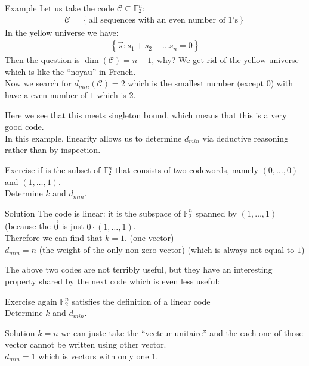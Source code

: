 \begin{parag}{Example}
    Let us take the code $\mathcal{C} \subseteq \mathbb{F}_2^n$:
    \begin{align*} \mathcal{C} =  \left\{\text{all sequences with an even number of 1's}\right\} \end{align*}
    In the yellow universe we have:
    \begin{align*} \left\{\vec{s}: s_1 + s_2 + \ldots s_n = 0\right\} \end{align*}
    Then the question is $\dim \left(\mathcal{C}\right) = n-1$, why? We get rid of the yellow universe which is like the ``noyau'' in French.\\
    Now we search for $d_{min}\left(\mathcal{C}\right) =  2$ which is the smallest number (except $0$) with have a even number of $1$ which is  2.
    \begin{framedremark}
        Here we see that this meets singleton bound, which means that this is a very good code.\\
        In this example, linearity allows us to determine $d_{min}$ via deductive reasoning rather than by inspection. 
    \end{framedremark}
\end{parag}
\begin{parag}{Exercise}
    if is the subset of $\mathbb{F}_2^n$ that consists of two codewords, namely $\left(0, \ldots, 0\right)$ and $\left(1, \ldots, 1\right)$.\\
    Determine $k$ and $d_{min}$.
    \begin{subparag}{Solution}
        The code is linear: it is the subspace of $\mathbb{F}_2^n$ spanned by $\left(1, \ldots, 1\right)$ (because the $\vec{0}$ is just $0 \cdot  \left(1, \ldots, 1\right)$.\\
        Therefore we can find that $k =  1$. (one vector)\\
        $d_{min} =  n$ (the weight of the only non zero vector) (which is always not equal to $1$)
    \end{subparag}
\end{parag}
    The above two codes are not terribly useful, but they have an interesting property shared by the next code which is even less useful:
\begin{parag}{Exercise again}
    $\mathbb{F}_2^n$ satisfies the definition of a linear code\\
    Determine $k$ and $d_{min}$.
    \begin{subparag}{Solution}
        $k =  n$ we can juste take the ``vecteur unitaire'' and the each one of those vector cannot be written using other vector.\\
        $d_{min} = 1$ which is vectors with only one $1$.
    \end{subparag}
\end{parag}
